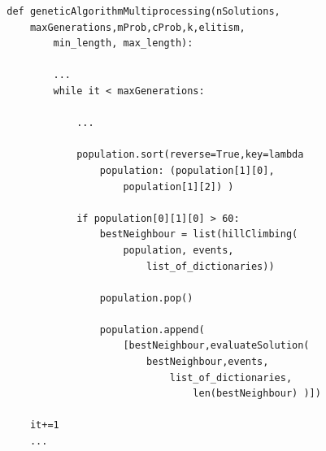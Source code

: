 \documentclass{article}
\begin{document}
\begin{lstlisting}
        def geneticAlgorithmMultiprocessing(nSolutions,
            maxGenerations,mProb,cProb,k,elitism, 
                min_length, max_length):
    
                ...
                while it < maxGenerations:
    
                    ...

                    population.sort(reverse=True,key=lambda 
                        population: (population[1][0], 
                            population[1][2]) )

                    if population[0][1][0] > 60:
                        bestNeighbour = list(hillClimbing(
                            population, events, 
                                list_of_dictionaries))
            
                        population.pop()
                
                        population.append(
                            [bestNeighbour,evaluateSolution(
                                bestNeighbour,events,
                                    list_of_dictionaries,
                                        len(bestNeighbour) )])
            
            it+=1
            ...
    \end{lstlisting}
\end{document}
